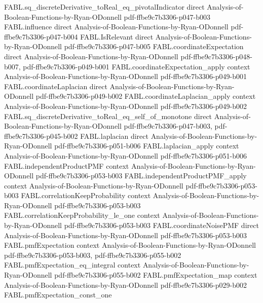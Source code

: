 \begin{theorem}
\proofstep
  {FABL.sq_discreteDerivative_toReal_eq_pivotalIndicator}
  {direct}
  {Analysis-of-Boolean-Functions-by-Ryan-ODonnell}
  {pdf-ffbe9c7b3306-p047-b003}
\proofstep
  {FABL.influence}
  {direct}
  {Analysis-of-Boolean-Functions-by-Ryan-ODonnell}
  {pdf-ffbe9c7b3306-p047-b004}
\proofstep
  {FABL.IsRelevant}
  {direct}
  {Analysis-of-Boolean-Functions-by-Ryan-ODonnell}
  {pdf-ffbe9c7b3306-p047-b005}
\proofstep
  {FABL.coordinateExpectation}
  {direct}
  {Analysis-of-Boolean-Functions-by-Ryan-ODonnell}
  {pdf-ffbe9c7b3306-p048-b007,
    pdf-ffbe9c7b3306-p049-b001}
\proofstep
  {FABL.coordinateExpectation_apply}
  {context}
  {Analysis-of-Boolean-Functions-by-Ryan-ODonnell}
  {pdf-ffbe9c7b3306-p049-b001}
\proofstep
  {FABL.coordinateLaplacian}
  {direct}
  {Analysis-of-Boolean-Functions-by-Ryan-ODonnell}
  {pdf-ffbe9c7b3306-p049-b002}
\proofstep
  {FABL.coordinateLaplacian_apply}
  {context}
  {Analysis-of-Boolean-Functions-by-Ryan-ODonnell}
  {pdf-ffbe9c7b3306-p049-b002}
\proofstep
  {FABL.sq_discreteDerivative_toReal_eq_self_of_monotone}
  {direct}
  {Analysis-of-Boolean-Functions-by-Ryan-ODonnell}
  {pdf-ffbe9c7b3306-p047-b003,
    pdf-ffbe9c7b3306-p045-b002}
\proofstep
  {FABL.laplacian}
  {direct}
  {Analysis-of-Boolean-Functions-by-Ryan-ODonnell}
  {pdf-ffbe9c7b3306-p051-b006}
\proofstep
  {FABL.laplacian_apply}
  {context}
  {Analysis-of-Boolean-Functions-by-Ryan-ODonnell}
  {pdf-ffbe9c7b3306-p051-b006}
\proofstep
  {FABL.independentProductPMF}
  {context}
  {Analysis-of-Boolean-Functions-by-Ryan-ODonnell}
  {pdf-ffbe9c7b3306-p053-b003}
\proofstep
  {FABL.independentProductPMF_apply}
  {context}
  {Analysis-of-Boolean-Functions-by-Ryan-ODonnell}
  {pdf-ffbe9c7b3306-p053-b003}
\proofstep
  {FABL.correlationKeepProbability}
  {context}
  {Analysis-of-Boolean-Functions-by-Ryan-ODonnell}
  {pdf-ffbe9c7b3306-p053-b003}
\proofstep
  {FABL.correlationKeepProbability_le_one}
  {context}
  {Analysis-of-Boolean-Functions-by-Ryan-ODonnell}
  {pdf-ffbe9c7b3306-p053-b003}
\proofstep
  {FABL.coordinateNoisePMF}
  {direct}
  {Analysis-of-Boolean-Functions-by-Ryan-ODonnell}
  {pdf-ffbe9c7b3306-p053-b003}
\proofstep
  {FABL.pmfExpectation}
  {context}
  {Analysis-of-Boolean-Functions-by-Ryan-ODonnell}
  {pdf-ffbe9c7b3306-p053-b003,
    pdf-ffbe9c7b3306-p055-b002}
\proofstep
  {FABL.pmfExpectation_eq_integral}
  {context}
  {Analysis-of-Boolean-Functions-by-Ryan-ODonnell}
  {pdf-ffbe9c7b3306-p055-b002}
\proofstep
  {FABL.pmfExpectation_map}
  {context}
  {Analysis-of-Boolean-Functions-by-Ryan-ODonnell}
  {pdf-ffbe9c7b3306-p029-b002}
\proofstep
  {FABL.pmfExpectation_const_one}

\end{theorem}
